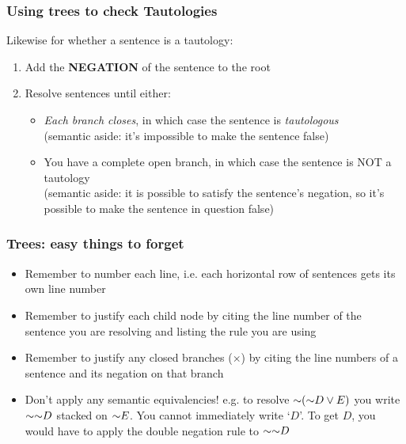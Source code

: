 \begin{frame}
\frametitle{Using trees to check Tautologies}

Likewise for whether a sentence is a tautology:

\begin{enumerate}[<+->]


\item Add the \textbf{NEGATION} of the sentence to the root

\item Resolve sentences until either:

\medskip

\begin{itemize}

\item \emph{Each branch closes}, in which case the sentence is \emph{tautologous} \\ (semantic aside: it's impossible to make the sentence false)

\item You have \textcolor{OGlyallpink}{a complete open branch}, in which case the sentence is NOT a tautology \\ (semantic aside: it is possible to satisfy the sentence's negation, so it's possible to make the sentence in question false)

\end{itemize}

\end{enumerate}

\end{frame}

\begin{frame}
\frametitle{Trees: easy things to forget}

\begin{itemize}[<+->]

\item Remember to number each line, i.e. each horizontal row of sentences gets its own line number

\item Remember to justify each child node by citing the line number of the sentence you are resolving and listing the rule you are using

\item Remember to justify any closed branches ($\times$) by citing the line numbers of a sentence and its negation on that branch

\item Don't apply any semantic equivalencies! e.g. to resolve $\enot (\enot D \eor E)$ you write $\enot \enot D$ stacked on $\enot E$. You cannot immediately write `$D$'. To get $D$, you would have to apply the double negation rule to $\enot \enot D$



\end{itemize}
\end{frame}

